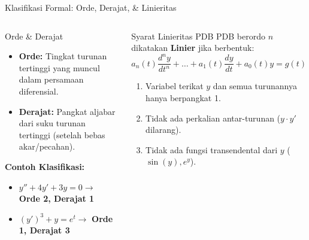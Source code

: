 \documentclass[aspectratio=169,10pt]{beamer}
\begin{document}
\begin{frame}{Klasifikasi Formal: Orde, Derajat, \& Linieritas}
  \begin{columns}[t]
    \begin{block}{Orde \& Derajat}
      \begin{itemize}
        \item \textbf{Orde:} Tingkat turunan tertinggi yang muncul dalam persamaan diferensial.
        \item \textbf{Derajat:} Pangkat aljabar dari suku turunan tertinggi (setelah bebas akar/pecahan).
      \end{itemize}
      \textbf{Contoh Klasifikasi:}
      \begin{itemize}
        \item $y'' + 4y' + 3y = 0 \rightarrow$ \textbf{Orde 2, Derajat 1}
        \item $(y')^3 + y = e^t \rightarrow$ \textbf{Orde 1, Derajat 3}
      \end{itemize}
    \end{block}

    \begin{alertblock}{Syarat Linieritas PDB}
      PDB berordo $n$ dikatakan \textbf{Linier} jika berbentuk:
      \begin{equation*}
        a_n(t) \frac{d^n y}{dt^n} + \dots + a_1(t) \frac{dy}{dt} + a_0(t) y = g(t)
      \end{equation*}
      \begin{enumerate}
        \item Variabel terikat $y$ dan semua turunannya hanya berpangkat 1.
        \item Tidak ada perkalian antar-turunan ($y \cdot y'$ dilarang).
        \item Tidak ada fungsi transendental dari $y$ ($\sin(y), e^y$).
      \end{enumerate}
    \end{alertblock}
  \end{columns}
\end{frame}
\end{document}
